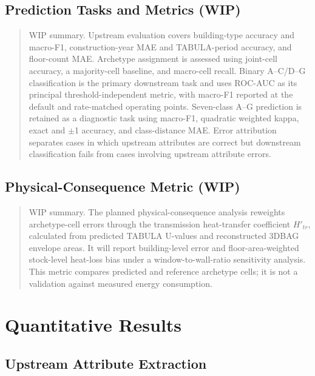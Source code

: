 \subsection{Prediction Tasks and Metrics (WIP)}
\label{sec:4_1_3}


\begin{quote}
WIP summary. Upstream evaluation covers building-type accuracy and macro-F1, construction-year MAE and TABULA-period accuracy, and floor-count MAE. Archetype assignment is assessed using joint-cell accuracy, a majority-cell baseline, and macro-cell recall. Binary A--C/D--G classification is the primary downstream task and uses ROC-AUC as its principal threshold-independent metric, with macro-F1 reported at the default and rate-matched operating points. Seven-class A--G prediction is retained as a diagnostic task using macro-F1, quadratic weighted kappa, exact and \ensuremath{\pm}1 accuracy, and class-distance MAE. Error attribution separates cases in which upstream attributes are correct but downstream classification fails from cases involving upstream attribute errors.
\end{quote}


\subsection{Physical-Consequence Metric (WIP)}
\label{sec:4_1_4}


\begin{quote}
WIP summary. The planned physical-consequence analysis reweights archetype-cell errors through the transmission heat-transfer coefficient \(H'_{tr}\), calculated from predicted TABULA U-values and reconstructed 3DBAG envelope areas. It will report building-level error and floor-area-weighted stock-level heat-loss bias under a window-to-wall-ratio sensitivity analysis. This metric compares predicted and reference archetype cells; it is not a validation against measured energy consumption.
\end{quote}


\section{Quantitative Results}
\label{sec:4_2}


\subsection{Upstream Attribute Extraction}
\label{sec:4_2_1}


